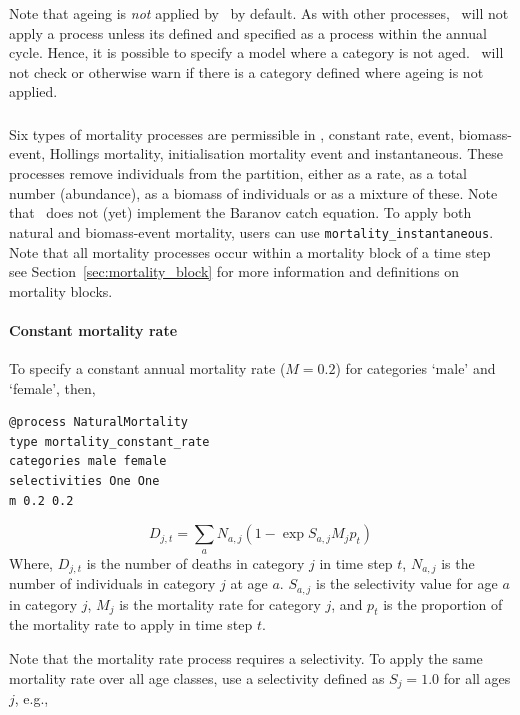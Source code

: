 Note that ageing is \emph{not} applied by \CNAME\ by default. As with other processes, \CNAME\ will not apply a process unless its defined and specified as a process within the annual cycle. Hence, it is possible to specify a model where a category is not aged. \CNAME\ will not check or otherwise warn if there is a category defined where ageing is not applied.

\subsubsection{\label{sec:mortality}}

Six types of mortality processes are permissible in \CNAME, constant rate, event, biomass-event, Hollings mortality, initialisation mortality event and instantaneous. These processes remove individuals from the partition, either as a rate, as a total number (abundance), as a biomass of individuals or as a mixture of these. Note that \CNAME\ does not (yet) implement the Baranov catch equation. To apply both natural and biomass-event mortality, users can use \texttt{mortality\_instantaneous}. Note that all mortality processes occur within a mortality block of a time step see Section~\ref{sec:mortality_block} for more information and definitions on mortality blocks. 

\paragraph{Constant mortality rate}

To specify a constant annual mortality rate ($M=0.2$) for categories `male' and `female', then, 
{\small{\begin{verbatim}
@process NaturalMortality
type mortality_constant_rate
categories male female
selectivities One One
m 0.2 0.2
\end{verbatim}}}

\begin{equation}
D_{j,t} = \sum_a N_{a,j} (1 - \exp{S_{a,j} M_j p_t})
\end{equation}
Where, $D_{j,t}$ is the number of deaths in category $j$ in time step $t$, $N_{a,j}$ is the number of individuals in category $j$ at age $a$. $S_{a,j}$ is the selectivity value for age $a$ in category $j$, $M_j$ is the mortality rate for category $j$, and $p_t$ is the proportion of the mortality rate to apply in time step $t$.

Note that the mortality rate process requires a selectivity. To apply the same mortality rate over all age classes, use a selectivity defined as $S_j=1.0$ for all ages $j$, e.g.,

